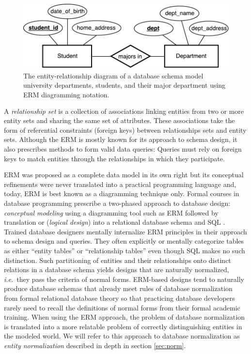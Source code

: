 \documentclass[letter,10pt]{article}
\begin{document}
\begin{figure}
\includegraphics[width=\columnwidth]{student-dept-erd.pdf}
\caption{The entity-relationship diagram of a database schema model university departments, students,  and their major department using ERM diagramming notation.}
\label{fig:erm-notation}
\end{figure}


A \emph{relationship set} is a collection of associations linking entities from two or more entity sets and sharing the same set of attributes. 
These associations take the form of referential constraints (foreign keys) between relationships sets and entity sets.
Although the ERM is mostly known for its approach to schema design, it also prescribes methods to form valid data queries: Queries must rely on foreign keys to match entities through the relationships in which they participate. 

ERM was proposed as a complete data model in its own right but its conceptual refinements were never translated into a practical programming language and, today, ERM is best known as a diagramming technique only.  
Formal courses in database programming prescribe a two-phased approach to database design: \emph{conceptual modeling} using a diagramming tool such as ERM followed by translation or (\emph{logical  design}) into a relational database schema and SQL \citep{elmasri-2015-fundamentals, coronel-2016-database}. 
Trained database designers mentally internalize ERM principles in their approach to schema design and queries.
They often explicitly or mentally categorize tables as either ``entity tables'' or ``relationship tables'' even though SQL makes no such distinction. 
Such partitioning of entities and their relationships onto distinct relations in a database schema yields designs that are naturally normalized, \emph{i.e.}\ they pass the criteria of normal forms. 
ERM-based designs tend to naturally produce database schemas that already  meet rules of database normalization from formal relational database theory so that practicing database developers rarely need to recall the definitions of normal forms from their formal academic training.
When using the ERM approach, the problem of database normalization is translated into a more relatable problem of correctly distinguishing entities in the modeled world.  
We will refer to this approach to database normalization as \emph{entity normalization} described in depth in section \ref{sec:norm}.
\end{document}
